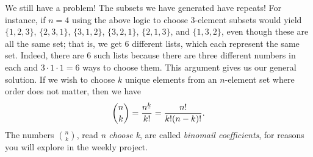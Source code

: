\documentclass[12pt, letterpaper]{article}
\theoremstyle{definition}
\newcommand{\fallingfactorial}[1]{%
  ^{\mspace{2mu}\underline{\mspace{-2mu}#1\mspace{-2mu}}\mspace{2mu}}%
}
\begin{document}
We still have a problem! The subsets we have generated have repeats!
For instance, if $n=4$ using the above logic to choose 3-element subsets would
yield $\{1,2,3\}$, $\{2,3,1\}$, $\{3,1,2\}$, $\{3,2,1\}$, $\{2,1,3\}$, and $\{1,3,2\}$,
even though these are all the same set; that is, we get 6 different lists,
which each represent the same set. Indeed, there are 6 such lists
because there are three different numbers in each and $3 \cdot 1 \cdot 1 = 6$
ways to choose them. This argument gives us our general solution. If we wish
to choose $k$ unique elements from an $n$-element set where order does not matter,
then we have
\begin{equation*}
    \binom{n}{k} = \frac{n\fallingfactorial{k}}{k!} = \frac{n!}{k!(n-k)!}.
\end{equation*}
The numbers $\binom{n}{k}$, read \emph{n choose k}, are called
\emph{binomail coefficients}, for reasons you will explore in the weekly project.
\end{document}
